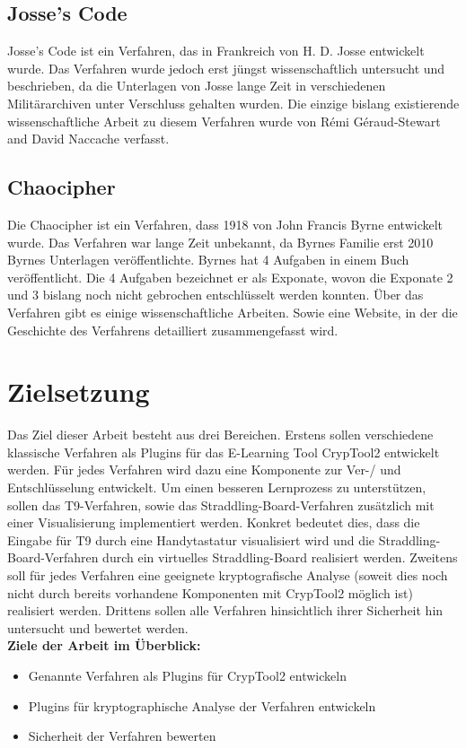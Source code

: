 \documentclass[fontsize=11pt, paper=a4, parskip=half]{scrartcl}
\begin{document}
\subsection{Josse's Code}
Josse's Code ist ein Verfahren, das in Frankreich von H. D. Josse entwickelt wurde. Das Verfahren wurde jedoch erst jüngst wissenschaftlich untersucht und beschrieben, da die Unterlagen von Josse lange Zeit in verschiedenen Militärarchiven unter Verschluss gehalten wurden. Die einzige bislang existierende wissenschaftliche Arbeit zu diesem Verfahren wurde von Rémi Géraud-Stewart and David Naccache verfasst. \cite{GeraudStewart2020AFrenchCipherFromTheLate19thCentury}
\subsection{Chaocipher}
Die Chaocipher ist ein Verfahren, dass 1918 von John Francis Byrne entwickelt wurde. Das Verfahren war lange Zeit unbekannt, da Byrnes Familie erst 2010 Byrnes Unterlagen veröffentlichte. Byrnes hat 4 Aufgaben in einem Buch veröffentlicht. Die 4 Aufgaben bezeichnet er als Exponate, wovon die Exponate 2 und 3 bislang noch nicht gebrochen entschlüsselt werden konnten.\cite{Cowan2010CHAOCIPHERSOLVINGEXHIBITS1and4} \cite{scheffler2010Chaocipher} Über das Verfahren gibt es einige wissenschaftliche Arbeiten. \cite{Rubin2011JohnFByrnesChaocipherRevealed} \cite{Hill2009CHAOCIPHERANALYSISANDMODELS}
 \cite{Rubin2010CHAOCIPHERREVEALEDTHEALGORITHM}
Sowie eine Website, in der die Geschichte des Verfahrens detailliert zusammengefasst wird.
 \cite{Rubin2020TheChaocipherClearingHouse}   
\section{Zielsetzung}
Das Ziel dieser Arbeit besteht aus drei Bereichen. Erstens sollen verschiedene klassische Verfahren als Plugins für das E-Learning Tool CrypTool2 entwickelt werden. Für jedes Verfahren wird dazu eine Komponente zur Ver-/ und Entschlüsselung entwickelt. Um einen besseren Lernprozess zu unterstützen, sollen das T9-Verfahren, sowie das Straddling-Board-Verfahren zusätzlich mit einer Visualisierung implementiert werden. Konkret bedeutet dies, dass die Eingabe für T9 durch eine Handytastatur visualisiert wird und die Straddling-Board-Verfahren durch ein virtuelles Straddling-Board realisiert werden. Zweitens soll für jedes Verfahren eine geeignete kryptografische Analyse (soweit dies noch nicht durch bereits vorhandene Komponenten mit CrypTool2 möglich ist) realisiert werden. Drittens sollen alle Verfahren hinsichtlich ihrer Sicherheit hin untersucht und bewertet werden.\\
\linebreak
\textbf{Ziele der Arbeit im Überblick:}
\begin{itemize}
	\item{Genannte Verfahren als Plugins für CrypTool2 entwickeln}
	\item{Plugins für kryptographische Analyse der Verfahren entwickeln}
	\item{Sicherheit der Verfahren bewerten}	
\end{itemize}
\end{document}
